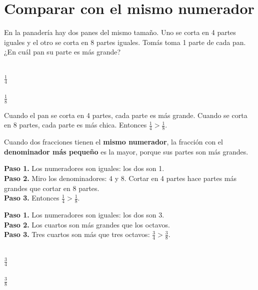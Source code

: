 \section{Comparar con el mismo numerador}

En la panadería hay dos panes del mismo tamaño. Uno se corta en 4 partes iguales y el otro se corta en 8 partes iguales. Tomás toma 1 parte de cada pan. ¿En cuál pan su parte es más grande?

\begin{center}
\\[1mm]
$\frac{1}{4}$\\[3mm]
\\[1mm]
$\frac{1}{8}$
\end{center}

Cuando el pan se corta en 4 partes, cada parte es más grande. Cuando se corta en 8 partes, cada parte es más chica. Entonces $\frac{1}{4} > \frac{1}{8}$.

\begin{wbidea}
Cuando dos fracciones tienen el \textbf{mismo numerador}, la fracción con el \textbf{denominador más pequeño} es la mayor, porque sus partes son más grandes.
\end{wbidea}

\begin{wbexample}
\textbf{Paso 1.} Los numeradores son iguales: los dos son 1.\\[1mm]
\textbf{Paso 2.} Miro los denominadores: 4 y 8. Cortar en 4 partes hace partes más grandes que cortar en 8 partes.\\[1mm]
\textbf{Paso 3.} Entonces $\frac{1}{4} > \frac{1}{8}$.
\end{wbexample}

\begin{wbexample}
\textbf{Paso 1.} Los numeradores son iguales: los dos son 3.\\[1mm]
\textbf{Paso 2.} Los cuartos son más grandes que los octavos.\\[1mm]
\textbf{Paso 3.} Tres cuartos son más que tres octavos: $\frac{3}{4} > \frac{3}{8}$.

\begin{center}
\\[1mm]
$\frac{3}{4}$\\[3mm]
\\[1mm]
$\frac{3}{8}$
\end{center}
\end{wbexample}


